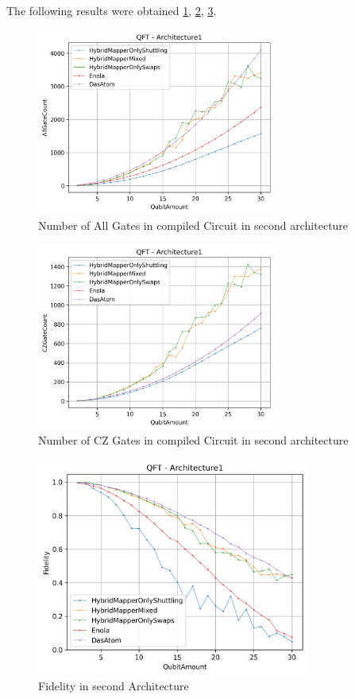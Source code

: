 The following results were obtained \ref{fig:AllGateCountArch2},
\ref{fig:CZGateCountArch2}, \ref{fig:FidelityArch2}.
\begin{figure}[htbp]
  \centering
    \includegraphics[width=0.7\textwidth]{figures/AllGateCountArch2.png}
    \caption[All Gate Number of second Architecture]{Number of All Gates in compiled Circuit in second architecture}
    \label{fig:AllGateCountArch2}
\end{figure}
\begin{figure}[htbp]
  \centering
    \includegraphics[width=0.7\textwidth]{figures/CZGateCountArch2.png}
    \caption[CZ Gate Number for first Architecture]{Number of CZ Gates in compiled Circuit in second architecture}
    \label{fig:CZGateCountArch2}
\end{figure}
\begin{figure}[htbp]
  \centering
    \includegraphics[width=0.8\textwidth]{figures/FidelityArch2.png}
    \caption[Fidelity in second Architecture]{Fidelity in second Architecture}
    \label{fig:FidelityArch2}
\end{figure}

